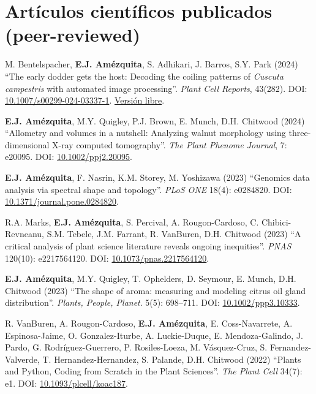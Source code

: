 \documentclass[A4,11pt]{article}
\begin{document}
		\section{Art\'iculos cient\'ificos publicados (peer-reviewed)}
		\begin{etaremune}
			\item M. Bentelspacher, \textbf{E.J. Amézquita}, S. Adhikari, J. Barros, S.Y. Park (2024) ``The early dodder gets the host: Decoding the coiling patterns of \emph{Cuscuta campestris} with automated image processing''. \emph{Plant Cell Reports}, 43(282). DOI: \hyperref{https://doi.org/10.1007/s00299-024-03337-1}{}{}{10.1007/s00299-024-03337-1}. \hyperref{https://rdcu.be/d0tH0}{}{}{Versi\'on libre}.
			\item \textbf{E.J. Amézquita}, M.Y. Quigley, P.J. Brown, E. Munch, D.H. Chitwood (2024) ``Allometry and volumes in a nutshell: Analyzing walnut morphology using three-dimensional X-ray computed tomography''. \emph{The Plant Phenome Journal}, 7: e20095. DOI: \hyperref{https://doi.org/10.1002/ppj2.20095}{}{}{10.1002/ppj2.20095}.
			\item \textbf{E.J. Amézquita}, F. Nasrin, K.M. Storey, M. Yoshizawa (2023) ``Genomics data analysis via spectral shape and topology''. \emph{PLoS ONE} 18(4): e0284820. DOI: \hyperref{https://doi.org/10.1371/journal.pone.0284820}{}{}{10.1371/journal.pone.0284820}.
			\item R.A. Marks, \textbf{E.J. Amézquita}, S. Percival, A. Rougon-Cardoso, C. Chibici-Revneanu, S.M. Tebele, J.M. Farrant, R. VanBuren, D.H. Chitwood (2023) ``A critical analysis of plant science literature reveals ongoing inequities''. \emph{PNAS} 120(10): e2217564120. DOI: \hyperref{https://doi.org/10.1073/pnas.2217564120}{}{}{10.1073/pnas.2217564120}.
			\item \textbf{E.J. Amézquita}, M.Y. Quigley, T. Ophelders, D. Seymour, E. Munch, D.H. Chitwood (2023) ``The shape of aroma: measuring and modeling citrus oil gland distribution''. \emph{Plants, People, Planet}. 5(5): 698--711. DOI: \hyperref{https://doi.org/10.1002/ppp3.10333}{}{}{10.1002/ppp3.10333}.
			\item R. VanBuren, A. Rougon-Cardoso, \textbf{E.J. Amézquita}, E. Coss-Navarrete, A. Espinosa-Jaime, O. Gonzalez-Iturbe, A. Luckie-Duque, E. Mendoza-Galindo, J. Pardo, G. Rodríguez-Guerrero, P. Rosiles-Loeza, M. Vásquez-Cruz, S. Fernandez-Valverde, T. Hernandez-Hernandez, S. Palande, D.H. Chitwood (2022) ``Plants and Python, Coding from Scratch in the Plant Sciences''. \emph{The Plant Cell} 34(7): e1. DOI: \hyperref{https://doi.org/10.1093/plcell/koac187}{}{}{10.1093/plcell/koac187}.

\end{etaremune}
\end{document}
